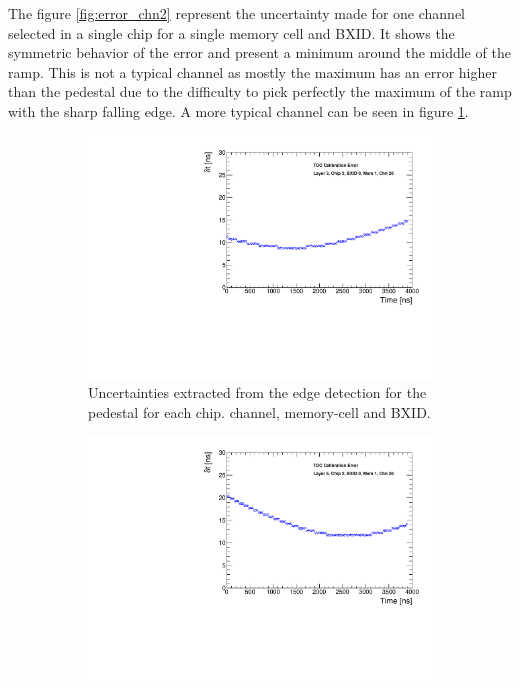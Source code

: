The figure \ref{fig:error_chn2} represent the uncertainty made for one channel selected in a single chip for a single memory cell and BXID. It shows the symmetric behavior of the error and present a minimum around the middle of the ramp. This is not a typical channel as mostly the maximum has an error higher than the pedestal due to the difficulty to pick perfectly the maximum of the ramp with the sharp falling edge. A more typical channel can be seen in figure \ref{fig:error_chn}.

\begin{figure}[htbp!]
	\begin{subfigure}[t]{0.49\textwidth}
		\centering
		\includegraphics[width=1\linewidth]{../Thesis_Plots/Timing/Muons/Plots/TimeErrorEstimation_Layer3.pdf}
		\caption{Uncertainties extracted from the edge detection for the pedestal for each chip. channel, memory-cell and BXID.} \label{fig:error_chn}
	\end{subfigure}
	\hfill
	\begin{subfigure}[t]{0.49\textwidth}
		\centering
		\includegraphics[width=1\linewidth]{../Thesis_Plots/Timing/Muons/Plots/TimeErrorEstimation_Layer5.pdf}

\end{subfigure}
\end{figure}

